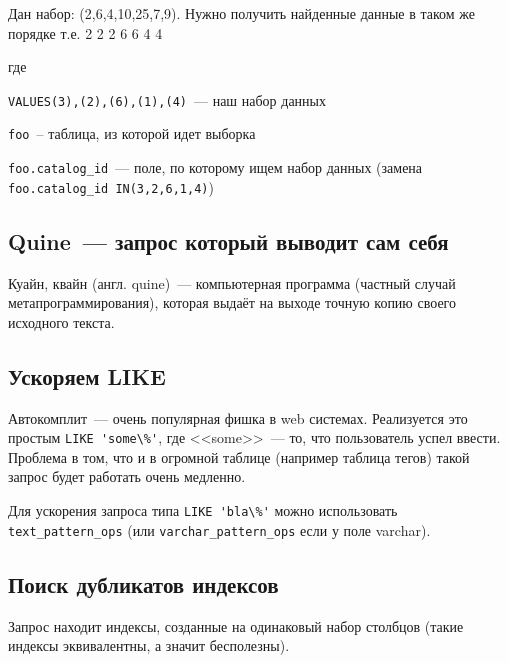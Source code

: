 Дан набор: (2,6,4,10,25,7,9). Нужно получить найденные данные в таком же порядке т.е. 2 2 2 6 6 4 4



где

\lstinline!VALUES(3),(2),(6),(1),(4)!~--- наш набор данных

\lstinline!foo!~-- таблица, из которой идет выборка

\lstinline!foo.catalog_id!~--- поле, по которому ищем набор данных (замена \lstinline!foo.catalog_id IN(3,2,6,1,4)!)



\subsection{Quine~--- запрос который выводит сам себя}

Куайн, квайн (англ. quine)~--- компьютерная программа (частный случай метапрограммирования), которая выдаёт на выходе точную копию своего исходного текста.





\subsection{Ускоряем LIKE}

Автокомплит~--- очень популярная фишка в web системах. Реализуется это простым \lstinline!LIKE 'some\%'!, где <<some>>~--- то, что пользователь успел ввести. Проблема в том, что и в огромной таблице (например таблица тегов) такой запрос будет работать очень медленно.

Для ускорения запроса типа \lstinline!LIKE 'bla\%'! можно использовать \lstinline!text_pattern_ops! (или \lstinline!varchar_pattern_ops! если у поле varchar).





\subsection{Поиск дубликатов индексов}

Запрос находит индексы, созданные на одинаковый набор столбцов (такие индексы эквивалентны, а значит бесполезны).

